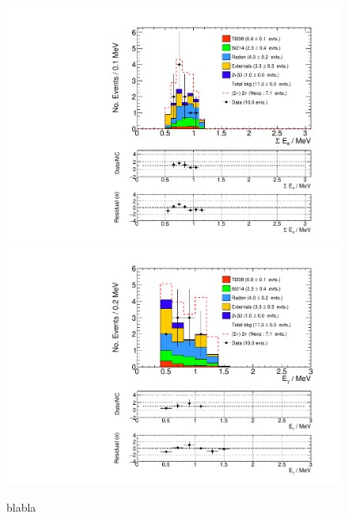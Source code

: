 \documentclass[main.tex]{subfiles}
\begin{document}
\begin{figure} [h!]
\begin{center}
\includegraphics[scale=0.5]{pictures/FinalResults/bb2nu2/250/SEe_bb2nu2.pdf}
\includegraphics[scale=0.5]{pictures/FinalResults/bb2nu2/250/Eg_bb2nu2.pdf}
\end{center}
\caption{blabla}
\label{plot:SEeAndEg250bb2nu2}
\end{figure}
\end{document}
